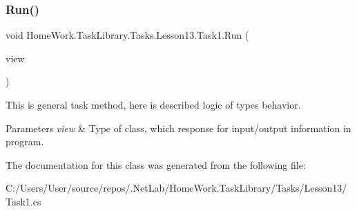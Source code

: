 \subsubsection{\texorpdfstring{Run()}{Run()}}
{\footnotesize\ttfamily void Home\+Work.\+Task\+Library.\+Tasks.\+Lesson13.\+Task1.\+Run (\begin{DoxyParamCaption}\item[{I\+Information}]{view }\end{DoxyParamCaption})}



This is general task method, here is described logic of types behavior. 


\begin{DoxyParams}{Parameters}
{\em view} & Type of class, which response for input/output information in program.\\
\hline
\end{DoxyParams}


The documentation for this class was generated from the following file\+:\begin{DoxyCompactItemize}
\item 
C\+:/\+Users/\+User/source/repos/.\+Net\+Lab/\+Home\+Work.\+Task\+Library/\+Tasks/\+Lesson13/Task1.\+cs\end{DoxyCompactItemize}
